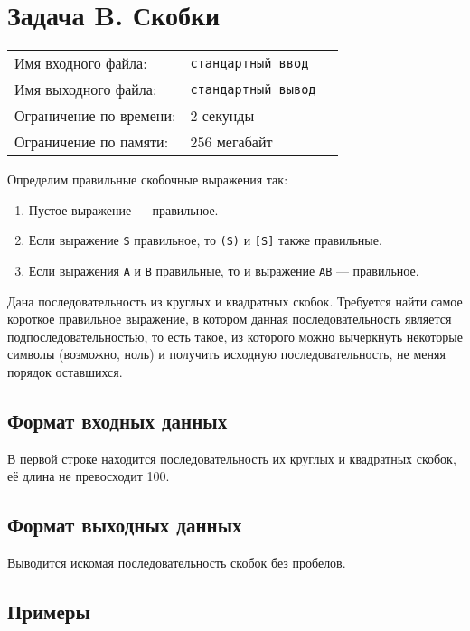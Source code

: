\documentclass[12pt]{scrartcl}
\newcommand{\inputFile}{стандартный ввод}
\newcommand{\outputFile}{стандартный вывод}
\begin{document}
\section*{Задача B. Скобки}

\begin{tabularx}{\textwidth}{l l X}
    Имя входного файла: & \texttt{\inputFile} \\
    Имя выходного файла: & \texttt{\outputFile} \\
    Ограничение по времени: & $2$ секунды \\
    Ограничение по памяти: & $256$ мегабайт \\
\end{tabularx}

Определим правильные скобочные выражения так: 

\begin{enumerate}
    \item Пустое выражение --- правильное.
    \item Если выражение \texttt{S} правильное, то \texttt{(S)} и \texttt{[S]} также правильные. 
    \item Если выражения \texttt{A} и \texttt{B} правильные, то и выражение \texttt{AB} --- правильное. 
\end{enumerate}

Дана последовательность из круглых и квадратных скобок.
Требуется найти самое короткое правильное выражение,
в котором данная последовательность является подпоследовательностью,
то есть такое, из которого можно вычеркнуть некоторые символы
(возможно, ноль) и получить исходную последовательность, не меняя порядок оставшихся.

\subsection*{Формат входных данных}
В первой строке находится последовательность их круглых и квадратных скобок, её длина не превосходит 100.

\subsection*{Формат выходных данных}
Выводится искомая последовательность скобок без пробелов.

\subsection*{Примеры}
\end{document}
